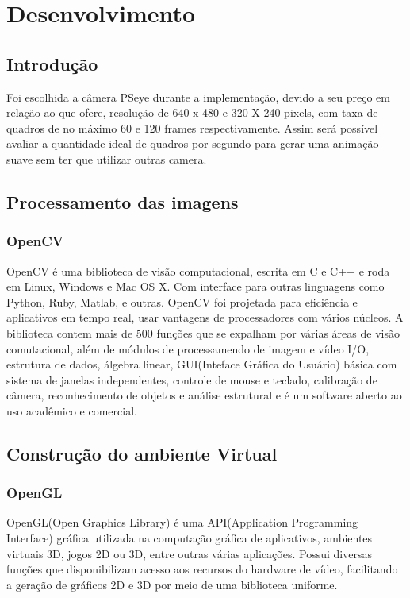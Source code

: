 \chapter{Desenvolvimento}

\section{Introdução}

Foi escolhida a câmera PSeye durante a implementação, devido a seu preço em relação ao que ofere, resolução de
640 x 480 e 320 X 240 pixels, com taxa de quadros de no máximo 60 e 120 frames respectivamente. Assim será possível
avaliar a quantidade ideal de quadros por segundo para gerar uma animação suave sem ter que utilizar outras camera.

\section{Processamento das imagens}

\subsection{OpenCV}

OpenCV é uma biblioteca de visão computacional, escrita em C e C++ e roda em
Linux, Windows e Mac OS X. Com interface para outras linguagens como Python, Ruby, Matlab,
e outras. OpenCV foi projetada para eficiência e aplicativos em tempo real, usar vantagens
de processadores com vários núcleos.
A biblioteca contem mais de 500 funções que se expalham por várias áreas de visão comutacional,
além de módulos de processamendo de imagem e vídeo I/O, estrutura de dados, álgebra linear,
GUI(Inteface Gráfica do Usuário) básica com sistema de janelas independentes, controle de
mouse e teclado, calibração de câmera, reconhecimento de objetos e análise estrutural e
é um software aberto ao uso acadêmico e comercial.\cite{LearningOpenCV}


\section{Construção do ambiente Virtual}

\subsection{OpenGL}

OpenGL(Open Graphics Library) é uma API(Application Programming Interface) gráfica utilizada
na computação gráfica de aplicativos, ambientes virtuais 3D, jogos 2D ou 3D, entre outras várias
aplicações. Possui diversas funções que disponibilizam acesso aos recursos do hardware de vídeo,
facilitando a geração de gráficos 2D e 3D por meio de uma biblioteca uniforme.

